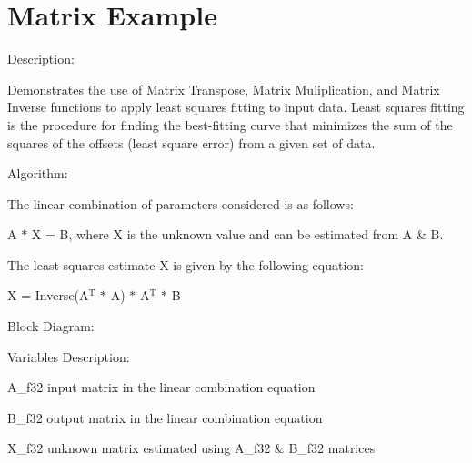 \hypertarget{group___matrix_example}{\section{Matrix Example}
\label{group___matrix_example}
}
\begin{DoxyParagraph}{Description\-: }

\end{DoxyParagraph}
\begin{DoxyParagraph}{}
Demonstrates the use of Matrix Transpose, Matrix Muliplication, and Matrix Inverse functions to apply least squares fitting to input data. Least squares fitting is the procedure for finding the best-\/fitting curve that minimizes the sum of the squares of the offsets (least square error) from a given set of data.
\end{DoxyParagraph}
\begin{DoxyParagraph}{Algorithm\-:}

\end{DoxyParagraph}
\begin{DoxyParagraph}{}
The linear combination of parameters considered is as follows\-: 
\end{DoxyParagraph}
\begin{DoxyParagraph}{}
{\ttfamily A $\ast$ X = B}, where {\ttfamily X} is the unknown value and can be estimated from {\ttfamily A} \& {\ttfamily B}. 
\end{DoxyParagraph}
\begin{DoxyParagraph}{}
The least squares estimate {\ttfamily X} is given by the following equation\-: 
\end{DoxyParagraph}
\begin{DoxyParagraph}{}
{\ttfamily X = Inverse(A$^{\mbox{T}}$  $\ast$ A) $\ast$ A$^{\mbox{T}}$  $\ast$ B}
\end{DoxyParagraph}
\begin{DoxyParagraph}{Block Diagram\-:}

\end{DoxyParagraph}
\begin{DoxyParagraph}{}

\end{DoxyParagraph}
\begin{DoxyParagraph}{Variables Description\-:}

\end{DoxyParagraph}
\begin{DoxyParagraph}{}
\begin{DoxyItemize}
\item {\ttfamily A\-\_\-f32} input matrix in the linear combination equation \item {\ttfamily B\-\_\-f32} output matrix in the linear combination equation \item {\ttfamily X\-\_\-f32} unknown matrix estimated using {\ttfamily A\-\_\-f32} \& {\ttfamily B\-\_\-f32} matrices\end{DoxyItemize}

\end{DoxyParagraph}
